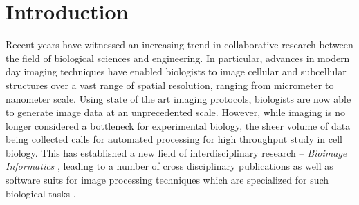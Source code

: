 
\chapter{Introduction} %

\label{Chapter1} %





%

Recent years have witnessed an increasing trend in collaborative research between the field of biological sciences and engineering. In particular, advances in modern day imaging techniques have enabled biologists to image cellular and subcellular structures over a vast range of spatial resolution, ranging from micrometer to nanometer scale.  Using state of the art imaging protocols, biologists are now able to generate image data at an unprecedented scale. However, while imaging is no longer considered a bottleneck for experimental biology, the sheer volume of data being collected calls for automated processing for high throughput study in cell biology. This has established a new field of interdisciplinary  research -- \textit{Bioimage Informatics} \cite{peng2008bioimage}, leading to a number of cross disciplinary publications as well as software suits for image processing techniques which are specialized for such biological tasks \cite{icy,schindelin2012fiji,schneider2012nih}.


